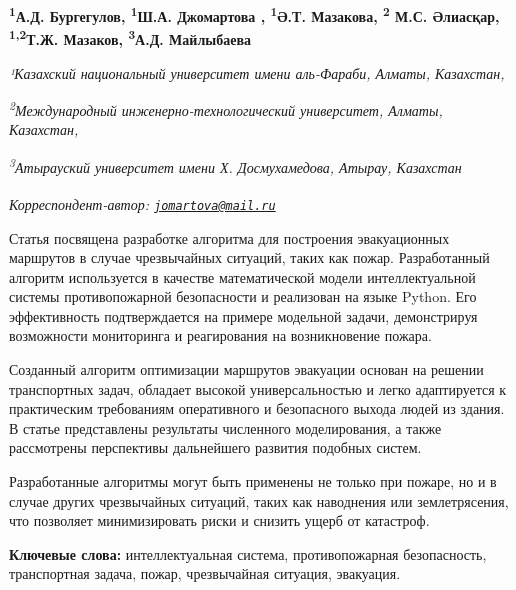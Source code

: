 
\begin{articleheader}

{\bfseries \textsuperscript{1}А.Д. Бургегулов\authorid,
\textsuperscript{1}Ш.А. Джомартова\textsuperscript{\envelope } \authorid,
\textsuperscript{1}Ә.Т. Мазакова\authorid,
\textsuperscript{2} М.С. Әлиасқар\authorid,
\textsuperscript{1,2}Т.Ж. Мазаков\authorid,
\textsuperscript{3}А.Д. Майлыбаева\authorid}
\end{articleheader}

\begin{affiliation}
\emph{¹Казахский национальный университет имени аль-Фараби, Алматы, Казахстан,}

\emph{\textsuperscript{2}Международный инженерно-технологический университет, Алматы, Казахстан,}

\emph{\textsuperscript{3}Атырауский университет имени Х. Досмухамедова, Атырау, Казахстан}

\raggedright \textsuperscript{\envelope }{\em Корреспондент-автор: \href{mailto:jomartova@mail.ru}{\nolinkurl{jomartova@mail.ru}}}
\end{affiliation}

Статья посвящена разработке алгоритма для построения эвакуационных
маршрутов в случае чрезвычайных ситуаций, таких как пожар. Разработанный
алгоритм используется в качестве математической модели интеллектуальной
системы противопожарной безопасности и реализован на языке Python. Его
эффективность подтверждается на примере модельной задачи, демонстрируя
возможности мониторинга и реагирования на возникновение пожара.

Созданный алгоритм оптимизации маршрутов эвакуации основан на решении
транспортных задач, обладает высокой универсальностью и легко
адаптируется к практическим требованиям оперативного и безопасного
выхода людей из здания. В статье представлены результаты численного
моделирования, а также рассмотрены перспективы дальнейшего развития
подобных систем.

Разработанные алгоритмы могут быть применены не только при пожаре, но и
в случае других чрезвычайных ситуаций, таких как наводнения или
землетрясения, что позволяет минимизировать риски и снизить ущерб от
катастроф.

{\bfseries Ключевые слова:} интеллектуальная система, противопожарная
безопасность, транспортная задача, пожар, чрезвычайная ситуация,
эвакуация.

